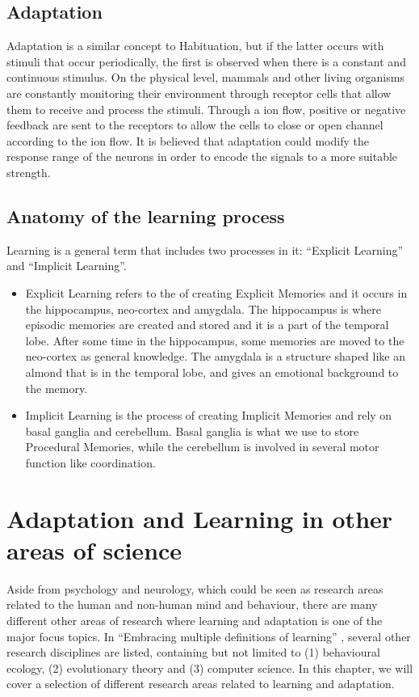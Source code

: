 \documentclass[conference]{IEEEtran}
\begin{document}
	\subsection{Adaptation}\label{Ad}
		Adaptation is a similar concept to Habituation, but if the latter occurs with stimuli that occur periodically, the first is observed when there is a constant and continuous stimulus.
		On the physical level, mammals and other living organisms are constantly monitoring their environment through receptor cells that allow them to receive and process the stimuli. Through a ion flow, positive or negative feedback are sent to the receptors to allow the cells to close or open channel according to the ion flow. \cite{b8}
		It is believed that adaptation could modify the response range of the neurons in order to encode the signals to a more suitable strength. \cite{b9}

	\subsection{Anatomy of the learning process}\label{ALP}
		Learning is a general term that includes two processes in it: ``Explicit Learning'' and ``Implicit Learning''.
		\begin{itemize}
			\item Explicit Learning refers to the of creating Explicit Memories and it occurs in the hippocampus, neo-cortex and amygdala. \cite{b10} The hippocampus is where episodic memories are created and stored and it is a part of the temporal lobe. After some time in the hippocampus, some memories are moved to the neo-cortex as general knowledge. The amygdala is a structure shaped like an almond that is in the temporal lobe, and gives an emotional background to the memory.
			\item Implicit Learning is the process of creating Implicit Memories and rely on basal ganglia and cerebellum. \cite{b11} Basal ganglia is what we use to store Procedural Memories, while the cerebellum is involved in several motor function like coordination.
		\end{itemize}

\section{Adaptation and Learning in other areas of science}

	Aside from psychology and neurology, which could be seen as research areas related to the human and non-human mind and behaviour, there are many different other areas of research where learning and adaptation is one of the major focus topics. In ``Embracing multiple definitions of learning'' \cite{6}, several other research disciplines are listed, containing but not limited to (1) behavioural ecology, (2) evolutionary theory and (3) computer science. In this chapter, we will cover a selection of different research areas related to learning and adaptation.
\end{document}
